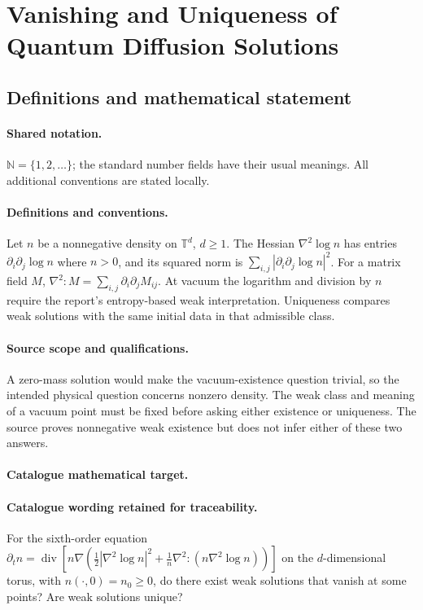 \documentclass[11pt]{article}
\begin{document}
\section{Vanishing and Uniqueness of Quantum Diffusion Solutions}\label{statement}

\subsection{Definitions and mathematical statement}

\paragraph{Shared notation.}$\mathbb N=\{1,2,\ldots\}$; the standard number fields have their usual meanings. All additional conventions are stated locally.


\paragraph{Definitions and conventions.} Let $n$ be a nonnegative density on $\mathbb T^d$, $d\ge1$. The Hessian $\nabla^2\log n$ has entries $\partial_i\partial_j\log n$ where $n>0$, and its squared norm is $\sum_{i,j}|\partial_i\partial_j\log n|^2$. For a matrix field $M$, $\nabla^2\!:\!M=\sum_{i,j}\partial_i\partial_jM_{ij}$. At vacuum the logarithm and division by $n$ require the report's entropy-based weak interpretation. Uniqueness compares weak solutions with the same initial data in that admissible class.

\paragraph{Source scope and qualifications.} A zero-mass solution would make the vacuum-existence question trivial, so the intended physical question concerns nonzero density. The weak class and meaning of a vacuum point must be fixed before asking either existence or uniqueness. The source proves nonnegative weak existence but does not infer either of these two answers.

\paragraph{Catalogue mathematical target.}
\paragraph{Catalogue wording retained for traceability.}
For the sixth-order equation $\partial_t n=\operatorname{div}\!\left[n\nabla\left(\frac12|\nabla^2\log n|^2+\frac1n\nabla^2\!:\!(n\nabla^2\log n)\right)\right]$ on the $d$-dimensional torus, with $n(\cdot,0)=n_0\geq0$, do there exist weak solutions that vanish at some points? Are weak solutions unique?
\end{document}
